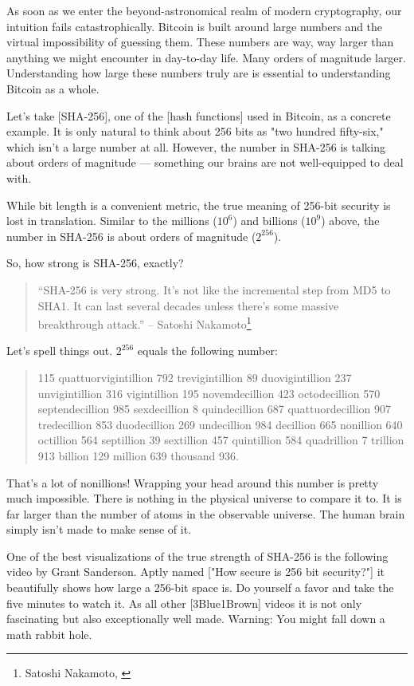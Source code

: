 As soon as we enter the beyond-astronomical realm of modern
cryptography, our intuition fails catastrophically. Bitcoin is built
around large numbers and the virtual impossibility of guessing them.
These numbers are way, way larger than anything we might encounter in
day-to-day life. Many orders of magnitude larger. Understanding how
large these numbers truly are is essential to understanding Bitcoin as a
whole.

Let's take [SHA-256], one of the [hash functions] used in Bitcoin, as a
concrete example. It is only natural to think about 256 bits as "two
hundred fifty-six," which isn't a large number at all. However, the
number in SHA-256 is talking about orders of magnitude --- something our
brains are not well-equipped to deal with.

While bit length is a convenient metric, the true meaning of 256-bit
security is lost in translation. Similar to the millions ($10^6$) and
billions ($10^9$) above, the number in SHA-256 is about orders of magnitude
($2^{256}$).

So, how strong is SHA-256, exactly?

\begin{quotation}
``SHA-256 is very strong. It's not like the incremental step from MD5
to SHA1. It can last several decades unless there's some massive
breakthrough attack.''
\flushright -- Satoshi Nakamoto\footnote{Satoshi Nakamoto, \cite{satoshi-sha256}}
\end{quotation}

Let's spell things out. $2^{256}$ equals the following number:

\begin{quotation}
    115 quattuorvigintillion 792 trevigintillion 89 duovigintillion 237
    unvigintillion 316 vigintillion 195 novemdecillion 423 octodecillion 570
    septendecillion 985 sexdecillion 8 quindecillion 687 quattuordecillion 907
    tredecillion 853 duodecillion 269 undecillion 984 decillion 665 nonillion
    640 octillion 564 septillion 39 sextillion 457 quintillion 584 quadrillion 7
    trillion 913 billion 129 million 639 thousand 936.
\end{quotation}

That's a lot of nonillions! Wrapping your head around this number is
pretty much impossible. There is nothing in the physical universe to
compare it to. It is far larger than the number of atoms in the
observable universe. The human brain simply isn't made to make sense of
it.

One of the best visualizations of the true strength of SHA-256 is the
following video by Grant Sanderson. Aptly named ["How secure is 256 bit
security?"] it beautifully shows how large a 256-bit space is. Do
yourself a favor and take the five minutes to watch it. As all other
[3Blue1Brown] videos it is not only fascinating but also exceptionally
well made. Warning: You might fall down a math rabbit hole.

